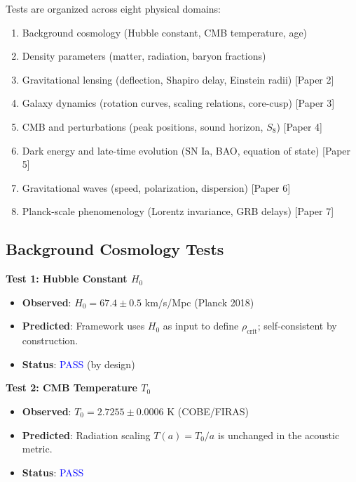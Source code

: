 \documentclass[11pt,a4paper]{article}
\newcommand{\rhocrit}{\ensuremath{\rho_{\mathrm{crit}}}}
\theoremstyle{definition}
\theoremstyle{remark}
\begin{document}
Tests are organized across eight physical domains:
\begin{enumerate}[label=\Alph*., leftmargin=*]
\item Background cosmology (Hubble constant, CMB temperature, age)
\item Density parameters (matter, radiation, baryon fractions)
\item Gravitational lensing (deflection, Shapiro delay, Einstein radii) [Paper 2]
\item Galaxy dynamics (rotation curves, scaling relations, core-cusp) [Paper 3]
\item CMB and perturbations (peak positions, sound horizon, $S_8$) [Paper 4]
\item Dark energy and late-time evolution (SN Ia, BAO, equation of state) [Paper 5]
\item Gravitational waves (speed, polarization, dispersion) [Paper 6]
\item Planck-scale phenomenology (Lorentz invariance, GRB delays) [Paper 7]
\end{enumerate}

\subsection{Background Cosmology Tests}
\label{sec:tests_background}

\textbf{Test 1: Hubble Constant $H_0$}

\begin{itemize}[leftmargin=*, itemsep=0.1em]
\item \textbf{Observed}: $H_0 = 67.4 \pm 0.5$ km/s/Mpc (Planck 2018) \cite{Planck2018}
\item \textbf{Predicted}: Framework uses $H_0$ as input to define $\rhocrit$; self-consistent by construction.
\item \textbf{Status}: \textcolor{blue}{PASS} (by design)
\end{itemize}

\textbf{Test 2: CMB Temperature $T_0$}

\begin{itemize}[leftmargin=*, itemsep=0.1em]
\item \textbf{Observed}: $T_0 = 2.7255 \pm 0.0006$ K (COBE/FIRAS) \cite{Fixsen2009}
\item \textbf{Predicted}: Radiation scaling $T(a) = T_0/a$ is unchanged in the acoustic metric.
\item \textbf{Status}: \textcolor{blue}{PASS}
\end{itemize}
\end{document}
